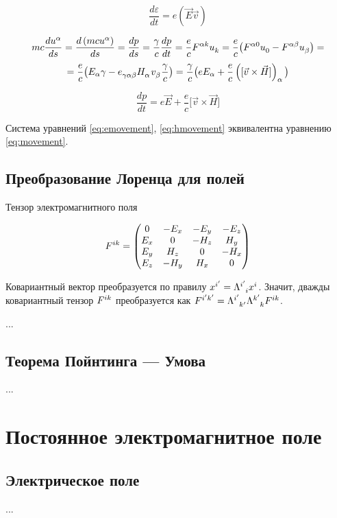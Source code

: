 \documentclass{article}
\begin{document}
\begin{equation}\label{eq:emovement}
    \frac{d\varepsilon}{dt}=e\left(\vec{E}\vec{v}\right)
\end{equation}

\begin{equation*}
    mc\frac{d\tensor{u}{^\alpha}}{ds}=\frac{d\left(mc\tensor{u}{^\alpha}\right)}{ds}=\frac{dp}{ds}=\frac{\gamma}{c}\frac{dp}{dt}=\frac{e}{c}\tensor{F}{^\alpha^k}\tensor{u}{_k}=\frac{e}{c}\big(\tensor{F}{^\alpha^0}\tensor{u}{_0}-\tensor{F}{^\alpha^\beta}\tensor{u}{_\beta}\big)=
\end{equation*}
\begin{equation*}
    =\frac{e}{c}\big(E_\alpha\gamma-\tensor{e}{_\gamma_\alpha_\beta}\tensor{H}{_\alpha}\tensor{v}{_\beta}\frac{\gamma}{c}\big)=\frac{\gamma}{c}\big(eE_\alpha+\frac{e}{c}\left(\lbrack\vec{v}\times\vec{H}\rbrack\right)_\alpha\big)
\end{equation*}

\begin{equation}\label{eq:hmovement}
    \frac{dp}{dt}=e\vec{E}+\frac{e}{c}\lbrack\vec{v}\times\vec{H}\rbrack
\end{equation}

Система уравнений \eqref{eq:emovement}, \eqref{eq:hmovement} эквивалентна уравнению \eqref{eq:movement}.

\subsection{Преобразование Лоренца для полей}

Тензор электромагнитного поля

\begin{equation}
    \tensor{F}{^i^k} =
    \begin{pmatrix}
        0 & -E_x & -E_y & -E_z \\
        E_x & 0 & -H_z & H_y \\
        E_y & H_z & 0 & -H_x \\
        E_z & -H_y & H_x & 0
    \end{pmatrix}
\end{equation}

Ковариантный вектор преобразуется по правилу $x^{i'}=\tensor{\Lambda}{^{i'}_{i}} x^i$. Значит, дважды ковариантный тензор $\tensor{F}{^i^k}$ преобразуется как $\tensor{F}{^{i'}^{k'}}=\tensor{\Lambda}{^{i'}_{k'}}\tensor{\Lambda}{^{k'}_{k}} \tensor{F}{^i^k}$.

...

\subsection{Теорема Пойнтинга --- Умова}

...

\section{Постоянное электромагнитное поле}

\subsection{Электрическое поле}

...
\end{document}
